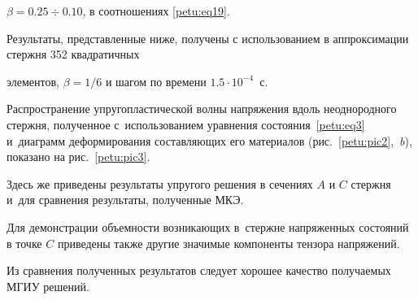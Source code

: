 $\beta=0.25\div 0.10$, в соотношениях \eqref{petu:eq19}. 

Результаты, представленные ниже, получены с использованием в аппроксимации стержня 352 квадратичных

элементов, $\beta=1/6$ и шагом по времени $1.5 \cdot 10^{-4}$~с.





Распространение упругопластической волны напряжения вдоль неоднородного стержня, полученное с~использованием уравнения состояния~\eqref{petu:eq3} и~диаграмм деформирования составляющих его материалов (рис.~\ref{petu:pic2},~{\sl b}), показано на рис.~\ref{petu:pic3}.

Здесь же приведены результаты упругого решения в сечениях $A$ и $C$ стержня и~для сравнения результаты, полученные МКЭ. 

Для демонстрации объемности возникающих в~стержне напряженных состояний в точке $C$ приведены также другие значимые компоненты тензора напряжений. 

Из сравнения полученных результатов следует хорошее качество получаемых МГИУ решений.







